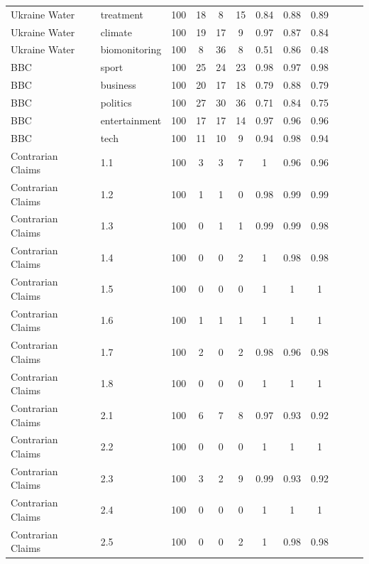 \documentclass{article}
\begin{document}
\begin{longtable}{@{}llcccccccccc@{}}
Ukraine   Water     & treatment     & 100 & 18 & 8  & 15 & 0.84 & 0.88 & 0.89 \\[1mm]
Ukraine   Water     & climate       & 100 & 19 & 17 & 9  & 0.97 & 0.87 & 0.84 \\[1mm]
Ukraine   Water     & biomonitoring & 100 & 8  & 36 & 8  & 0.51 & 0.86 & 0.48 \\[1mm]
BBC                 & sport         & 100 & 25 & 24 & 23 & 0.98 & 0.97 & 0.98 \\[1mm]
BBC                 & business      & 100 & 20 & 17 & 18 & 0.79 & 0.88 & 0.79 \\[1mm]
BBC                 & politics      & 100 & 27 & 30 & 36 & 0.71 & 0.84 & 0.75 \\[1mm]
BBC                 & entertainment & 100 & 17 & 17 & 14 & 0.97 & 0.96 & 0.96 \\[1mm]
BBC                 & tech          & 100 & 11 & 10 & 9  & 0.94 & 0.98 & 0.94 \\[1mm]
Contrarian   Claims & 1.1           & 100 & 3  & 3  & 7  & 1    & 0.96 & 0.96 \\[1mm]
Contrarian   Claims & 1.2           & 100 & 1  & 1  & 0  & 0.98 & 0.99 & 0.99 \\[1mm]
Contrarian   Claims & 1.3           & 100 & 0  & 1  & 1  & 0.99 & 0.99 & 0.98 \\[1mm]
Contrarian   Claims & 1.4           & 100 & 0  & 0  & 2  & 1    & 0.98 & 0.98 \\[1mm]
Contrarian   Claims & 1.5           & 100 & 0  & 0  & 0  & 1    & 1    & 1    \\[1mm]
Contrarian   Claims & 1.6           & 100 & 1  & 1  & 1  & 1    & 1    & 1    \\[1mm]
Contrarian   Claims & 1.7           & 100 & 2  & 0  & 2  & 0.98 & 0.96 & 0.98 \\[1mm]
Contrarian   Claims & 1.8           & 100 & 0  & 0  & 0  & 1    & 1    & 1    \\[1mm]
Contrarian   Claims & 2.1           & 100 & 6  & 7  & 8  & 0.97 & 0.93 & 0.92 \\[1mm]
Contrarian   Claims & 2.2           & 100 & 0  & 0  & 0  & 1    & 1    & 1    \\[1mm]
Contrarian   Claims & 2.3           & 100 & 3  & 2  & 9  & 0.99 & 0.93 & 0.92 \\[1mm]
Contrarian   Claims & 2.4           & 100 & 0  & 0  & 0  & 1    & 1    & 1    \\[1mm]
Contrarian   Claims & 2.5           & 100 & 0  & 0  & 2  & 1    & 0.98 & 0.98 \\[1mm]

\end{longtable}
\end{document}
